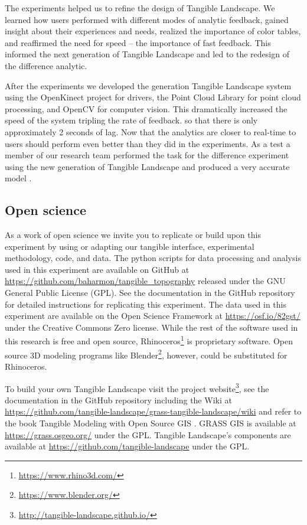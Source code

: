 \documentclass[prodmode,acmtochi]{acmsmall} %
\begin{document}
The experiments helped us to refine the design of Tangible Landscape. 
%
We learned how users performed with different modes of analytic feedback, 
gained insight about their experiences and needs,
realized the importance of color tables, 
and reaffirmed the need for speed -- the importance of fast feedback. 
%
This informed the next generation of Tangible Landscape 
and led to the redesign of the difference analytic. 


After the experiments
we developed the  generation Tangible Landscape system
using 
the OpenKinect project for drivers,
the Point Cloud Library for point cloud processing, 
and OpenCV for computer vision. 
%
This dramatically increased the speed of the system
tripling the rate of feedback.
so that there is only approximately 2 seconds of lag. 
%
Now that the analytics are closer to real-time to
users should perform even better than they did in the experiments.
%
As a test a member of our research team 
performed the task for the difference experiment 
using the new generation of Tangible Landscape
and produced a very accurate model \cite{ncsu_geoforall_2016}. 


\subsection{Open science}
As a work of open science we invite you to
replicate or build upon this experiment by 
using or adapting our tangible interface, experimental methodology, code, and data. 
The python scripts for data processing and analysis used in this experiment 
are available on GitHub at 
\url{https://github.com/baharmon/tangible_topography}
released under the GNU General Public License (GPL). 
See the documentation in the GitHub repository 
for detailed instructions for replicating this experiment. 
The data used in this experiment are available on the Open Science Framework 
at \url{https://osf.io/82gst/} under the Creative Commons Zero license.
While the rest of the software used in this research is free and open source, 
Rhinoceros\footnote{\url{https://www.rhino3d.com/}} is proprietary software. 
Open source 3D modeling programs like 
Blender\footnote{\url{https://www.blender.org/}}, however,
could be substituted for Rhinoceros. 

To build your own Tangible Landscape
visit the project website\footnote{\url{http://tangible-landscape.github.io/}}, 
see the documentation in the GitHub repository 
including the Wiki at \url{https://github.com/tangible-landscape/grass-tangible-landscape/wiki}
and refer to the book Tangible Modeling with Open Source GIS \cite{Petrasova2015}.
GRASS GIS is available at
\url{https://grass.osgeo.org/} 
under the GPL. 
Tangible Landscape's components are available at
\url{https://github.com/tangible-landscape}
under the GPL. 
\end{document}

